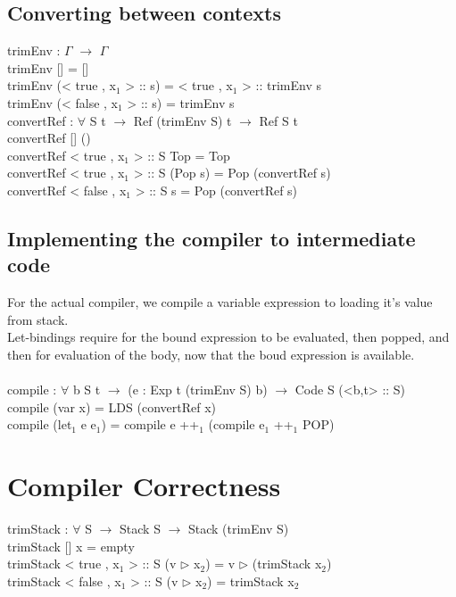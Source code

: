 \documentclass[paper=a4, fontsize=11pt]{scrartcl} %
\numberwithin{equation}{section} %
\numberwithin{figure}{section} %
\numberwithin{table}{section} %
\begin{document}
\subsection{Converting between contexts}

\ttfamily
trimEnv : $\Gamma$ $\rightarrow$ $\Gamma$\\
trimEnv [] = []\\
trimEnv (< true , x$_1$ > :: s) = < true , x$_1$ > :: trimEnv s\\
trimEnv (< false , x$_1$ > :: s) = trimEnv s\\

convertRef : $\forall$ {S t} $\rightarrow$ Ref (trimEnv S) t $\rightarrow$ Ref S t\\
convertRef {[]} ()\\
convertRef {< true , x$_1$ > :: S} Top = Top\\
convertRef {< true , x$_1$ > :: S} (Pop s) = Pop (convertRef s)\\
convertRef {< false , x$_1$ > :: S} s = Pop (convertRef s)\\
\normalfont

\subsection{Implementing the compiler to intermediate code}
For the actual compiler, we compile a variable expression to loading it's value from stack.\\
Let-bindings require for the bound expression to be evaluated, then popped, and then for evaluation of the body, now that the boud expression is available.\\
\\
\ttfamily
compile : $\forall$ {b S t} $\rightarrow$ (e : Exp t (trimEnv S) b) $\rightarrow$ Code S (<b,t> :: S)\\
compile (var x) = LDS (convertRef x)\\
compile (let$_1$ e e$_1$) = compile e ++$_1$ (compile e$_1$ ++$_1$ POP)\\
\normalfont

\section{Compiler Correctness}
\ttfamily
trimStack : $\forall$ {S} $\rightarrow$ Stack S $\rightarrow$ Stack (trimEnv S)\\
trimStack {[]} x = empty\\
trimStack {< true , x$_1$ > :: S} (v $\rhd$ x$_2$) = v $\rhd$ (trimStack x$_2$)\\
trimStack {< false , x$_1$ > :: S} (v $\rhd$ x$_2$) = trimStack x$_2$\\
\end{document}
